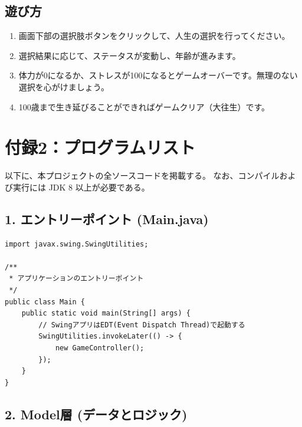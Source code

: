 \documentclass[a4paper,11pt]{jsarticle}
\begin{document}
\subsection*{遊び方}
\begin{enumerate}
    \item 画面下部の選択肢ボタンをクリックして、人生の選択を行ってください。
    \item 選択結果に応じて、ステータスが変動し、年齢が進みます。
    \item 体力が0になるか、ストレスが100になるとゲームオーバーです。無理のない選択を心がけましょう。
    \item 100歳まで生き延びることができればゲームクリア（大往生）です。
\end{enumerate}



\section{付録2：プログラムリスト}
以下に、本プロジェクトの全ソースコードを掲載する。
なお、コンパイルおよび実行には JDK 8 以上が必要である。

\subsection*{1. エントリーポイント (Main.java)}
\begin{lstlisting}[caption=Main.java]
import javax.swing.SwingUtilities;

/**
 * アプリケーションのエントリーポイント
 */
public class Main {
    public static void main(String[] args) {
        // SwingアプリはEDT(Event Dispatch Thread)で起動する
        SwingUtilities.invokeLater(() -> {
            new GameController();
        });
    }
}
\end{lstlisting}

\subsection*{2. Model層 (データとロジック)}
\end{document}
